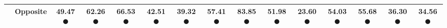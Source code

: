 \begin{table}[t]
{\begin{tabular}{@{}ccccccccccccccc@{}}
& Opposite & \textbf{49.47} \textcolor{green!60!black}{$\CIRCLE$} & \textbf{62.26} \textcolor{green!60!black}{$\CIRCLE$} & \textbf{66.53} \textcolor{green!60!black}{$\CIRCLE$} & 42.51 \textcolor{red!60!black}{$\CIRCLE$} & \textbf{39.32} \textcolor{green!60!black}{$\CIRCLE$} & 57.41 \textcolor{green!60!black}{$\CIRCLE$} & \textbf{83.85} \textcolor{green!60!black}{$\CIRCLE$} & \textbf{51.98} \textcolor{green!60!black}{$\CIRCLE$} & 23.60 \textcolor{green!60!black}{$\CIRCLE$} & \textbf{54.03} \textcolor{green!60!black}{$\CIRCLE$} & 55.68 \textcolor{green!60!black}{$\CIRCLE$} & \textbf{36.30} \textcolor{green!60!black}{$\CIRCLE$} & 34.56 \textcolor{red!60!black}{$\CIRCLE$} \\
\bottomrule
\end{tabular}%
}
\vspace{-10pt}
\end{table}
\endgroup